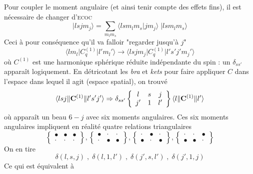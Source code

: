 Pour coupler le moment angulaire (et ainsi tenir compte des effets fins), il est nécessaire de changer
d'\textsc{ecoc}
\begin{equation}
\vert lsjm_j  \rangle = \sum_{m_l m_s} \langle lsm_lm_s \vert jm_j \rangle \; \vert lsm_lm_s \rangle
\end{equation}
Ceci à pour conséquence qu'il va falloir "regarder jusqu'à $j$"
\begin{equation}
 \langle l m_l \vert C^{(1)}_q \vert l'm_l' \rangle
\rightarrow
\langle l s j m_j \vert C^{(1)}_q \vert l's' j' m_j' \rangle
\end{equation}
où $C^{(1)}$ est une harmonique sphérique réduite indépendante du spin : un $\delta_{ss'}$ apparaît
logiquement. En détricotant les \textit{bra} et \textit{kets} pour faire appliquer $C$ dans l'espace
dans lequel il agit (espace spatial), on trouvé
\begin{equation}
\langle l s j \Vert {\bf C}^{(1)} \Vert l's' j' \rangle 
\Rightarrow \delta_{ss'}
\left\{ \begin{array}{ccc}
l & s & j \\ j' & 1 & l' \end{array} \right\} \langle l  \Vert {\bf C}^{(1)} \Vert l' \rangle
\end{equation}
où apparaît un beau $6-j$ avec six moments angulaires. Ces six moments angulaires impliquent en
réalité quatre relations triangulaires
\begin{equation}
\left\{ \begin{array}{ccc}
\bullet  & \bullet & \bullet \\ \cdot & \cdot & \cdot \end{array} 
\right\},
\left\{ \begin{array}{ccc}
\bullet  & \cdot & \cdot \\ \cdot & \bullet & \bullet \end{array} 
\right\},
\left\{ \begin{array}{ccc}
\cdot & \bullet & \cdot \\ \bullet & \cdot & \bullet \end{array} 
\right\},
\left\{ \begin{array}{ccc}
\cdot & \cdot & \bullet \\ \bullet & \bullet & \cdot \end{array} 
\right\}
\end{equation}
On en tire
\begin{equation}
\delta(l,s,j) \; , \; \delta(l,1,l') \; , \; \delta(j',s,l')  \; , \; \delta(j',1,j)
\end{equation}
Ce qui est équivalent à\\

